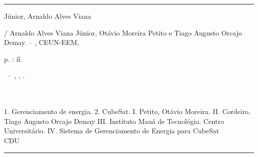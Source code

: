 \documentclass[
	12pt,				%
	openright,			%
	oneside,			%
	a4paper,			%
	english,			%
	french,				%
	spanish,			%
	brazil,				%
	oldfontcommands
	]{abntex2}
\begin{document}
\frenchspacing 

\imprimircapa

\imprimirfolhaderosto*


%
%     
\begin{fichacatalografica}
	\vspace*{\fill}					%
	\hrule							%
	\begin{center}					%
	\begin{minipage}[c]{12.5cm}		%
	
	Júnior, Arnaldo Alves Viana
	
	\hspace{0.5cm} \imprimirtitulo  / Arnaldo Alves Viana Júnior, Otávio Moreira Petito e Tiago Augusto Orcajo Demay. --
	\imprimirlocal, CEUN-EEM, \imprimirdata
	
	\hspace{0.5cm} \pageref{LastPage} p. : il. \\
	
	\hspace{0.5cm}
	\parbox[t]{\textwidth}{\imprimirtipotrabalho~--~\imprimirinstituicao,
	\imprimirlocal, \imprimirdata.}\\
	
	\hspace{0.5cm} \imprimirorientadorRotulo~\imprimirorientador\\
	
	\hspace{0.5cm}
		1. Gerenciamento de energia.
		2. CubeSat.
		I. Petito, Otávio Moreira.
		II. Cordeiro, Tiago Augusto Orcajo Demay
		III. Instituto Mauá de Tecnológia. Centro Universitário.
		IV. Sistema de Gerenciamento de Energia para CubeSat\\ 			
	
	\hspace{8.75cm} CDU \\
	
	\end{minipage}
	\end{center}
	\hrule
\end{fichacatalografica}
\end{document}
